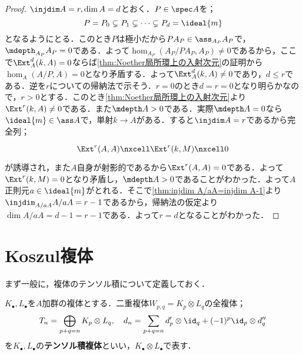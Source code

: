 \begin{proof}
	$\injdim A=r,\dim A=d$とおく．$P\in\spec A$を；
	\[P=P_0\subsetneq P_1\subsetneq\dots\subsetneq P_d=\ideal{m}\]
	となるようにとる．このとき$P$は極小だから$PA_P\in\ass_{A_P}A_P$で，$\mdepth_{A_P}A_P=0$である．よって$\hom_{A_P}(A_P/PA_P,A_P)\neq0$であるから，ここで$\Ext^d_A(k,A)=0$ならば\ref{thm:Noether局所環上の入射次元}の証明から$\hom_A(A/P,A)=0$となり矛盾する．よって$\Ext^d_A(k,A)\neq0$であり，$d\leq r$である．逆を$r$についての帰納法で示そう．$r=0$のとき$d=r=0$となり明らかなので，$r>0$とする．このとき\ref{thm:Noether局所環上の入射次元}より$\Ext^r(k,A)\neq0$である．また$\mdepth A>0$である．実際$\mdepth A=0$なら$\ideal{m}\in\ass A$で，単射$k\to A$がある．すると$\injdim A=r$であるから完全列；
	\[\begin{tikzcd}
		\Ext^r(A,A)\nxcell\Ext^r(k,M)\nxcell0
	\end{tikzcd}\]
	が誘導され，また$A$自身が射影的であるから$\Ext^r(A,A)=0$である．よって$\Ext^r(k,M)=0$となり矛盾し，$\mdepth A>0$であることがわかった．よって$A$正則元$a\in\ideal{m}$がとれる．そこで\ref{thm:injdim A/aA=injdim A-1}より$\injdim_{A/aA}A/aA=r-1$であるから，帰納法の仮定より$\dim A/aA=d-1=r-1$である．よって$r=d$となることがわかった．
\end{proof}

\section{Koszul複体}

まず一般に，複体のテンソル積について定義しておく．
\begin{defi}[複体のテンソル積]
	$K_\bullet,L_\bullet$を$A$加群の複体とする．二重複体$W_{p,q}=K_p\otimes L_q$の全複体；
	\[T_n=\bigoplus_{p+q=n} K_p\otimes L_q,\quad d_n=\sum_{p+q=n} d'_p\otimes\id_q+(-1)^p\id_p\otimes d''_q\]
	を$K_\bullet, L_\bullet$の\textbf{テンソル積複体}といい，$K_\bullet\otimes L_\bullet$で表す．
\end{defi}




